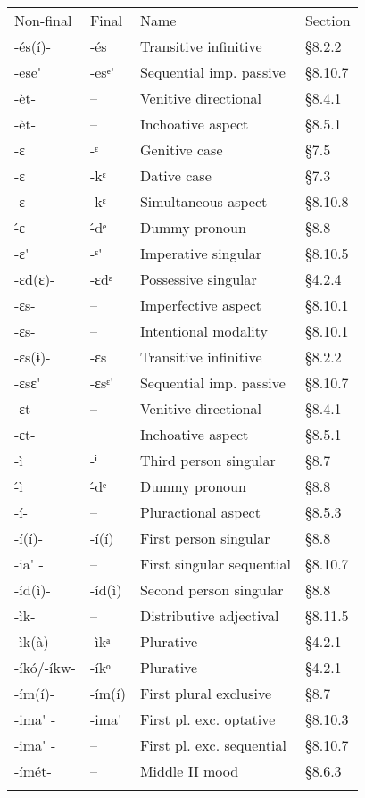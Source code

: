 \begin{tabularx}{\textwidth}{XXXX}
\lsptoprule

Non-final & Final & Name & Section\\
{}-és(í)- & {}-és & Transitive infinitive & §8.2.2\\
{}-ese\'{}  & {}-esᵉ\'{}  & Sequential imp. passive & §8.10.7\\
{}-èt- & – & Venitive directional & §8.4.1\\
{}-èt- & – & Inchoative aspect & §8.5.1\\
{}-ɛ & {}-ᵋ & Genitive case & §7.5\\
{}-ɛ & {}-kᵋ & Dative case & §7.3\\
{}-ɛ & {}-kᵋ & Simultaneous aspect & §8.10.8\\
{}\'{-}ɛ & {}\'{-}dᵉ & Dummy pronoun & §8.8\\
{}-ɛ\'{}  & {}-ᵋ\'{}  & Imperative singular & §8.10.5\\
{}-ɛd(ɛ)- & {}-ɛdᵋ & Possessive singular & §4.2.4\\
{}-ɛs- & – & Imperfective aspect & §8.10.1\\
{}-ɛs- & – & Intentional modality & §8.10.1\\
{}-ɛs(ɨ)- & {}-ɛs & Transitive infinitive & §8.2.2\\
{}-ɛsɛ\'{}  & {}-ɛsᵋ\'{}  & Sequential imp. passive & §8.10.7\\
{}-ɛt- & – & Venitive directional & §8.4.1\\
{}-ɛt- & – & Inchoative aspect & §8.5.1\\
{}-ì & {}-ⁱ & Third person singular & §8.7\\
{}\'{-}ì & {}\'{-}dᵉ & Dummy pronoun & §8.8\\
{}-í- & – & Pluractional aspect & §8.5.3\\
{}-í(í)- & {}-í(í) & First person singular & §8.8\\
{}-ia\'{} - & – & First singular sequential & §8.10.7\\
{}-íd(ì)- & {}-íd(ì) & Second person singular & §8.8\\
{}-ìk- & – & Distributive adjectival & §8.11.5\\
{}-ìk(à)- & {}-ìkᵃ & Plurative & §4.2.1\\
{}-íkó/-íkw- & {}-íkᵒ & Plurative & §4.2.1\\
{}-ím(í)- & {}-ím(í) & First plural exclusive & §8.7\\
{}-ima\'{} - & {}-ima\'{}  & First pl. exc. optative & §8.10.3\\
{}-ima\'{} - & – & First pl. exc. sequential & §8.10.7\\
{}-ímét- & – & Middle II mood & §8.6.3\\
\lspbottomrule
\end{tabularx}

